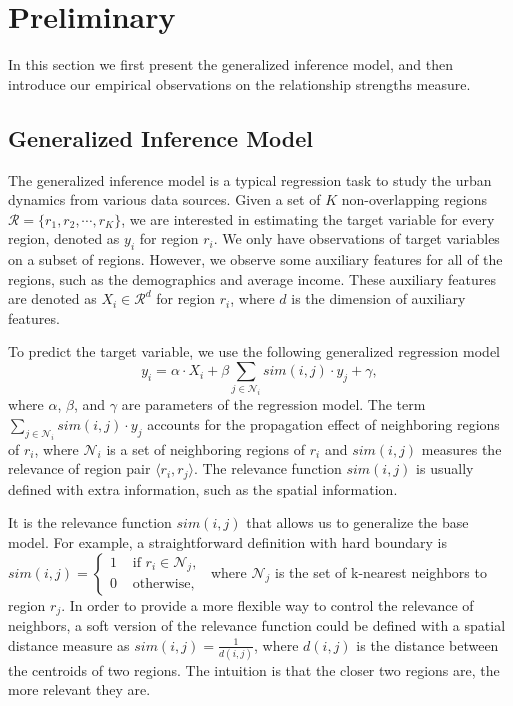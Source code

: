 \section{Preliminary}
\label{ch3-sec:prel}


In this section we first present the generalized inference model, and then introduce our empirical observations on the relationship strengths measure.


\subsection{Generalized Inference Model}

The generalized inference model is a typical regression task to study the urban dynamics from various data sources. Given a set of $K$ non-overlapping regions $\mathcal{R} = \{ r_1, r_2, \cdots, r_K \}$, we are interested in estimating the target variable for every region, denoted as $y_i$ for region $r_i$. We only have observations of target variables on a subset of regions. However, we observe some auxiliary features for all of the regions, such as the demographics and average income. These auxiliary features are denoted as $X_i \in \mathcal{R}^d$ for region $r_i$, where $d$ is the dimension of auxiliary features.


To predict the target variable, we use the following generalized regression model
\begin{equation}
\label{eq:basemodel}
y_i = \alpha \cdot X_i + \beta \sum_{j \in \mathcal{N}_i} sim(i,j) \cdot y_j + \gamma,
\end{equation}
where $\alpha$, $\beta$, and $\gamma$ are parameters of the regression model. The term $\sum_{j \in \mathcal{N}_i} sim(i,j) \cdot y_j$ accounts for the propagation effect of neighboring regions of $r_i$, where $\mathcal{N}_i$ is a set of neighboring regions of $r_i$ and $sim(i,j)$ measures the relevance of region pair $\langle r_i, r_j \rangle$. The relevance function $sim(i,j)$ is usually defined with extra information, such as the spatial information.


It is the relevance function $sim(i,j)$ that allows us to generalize the base model. For example, a straightforward definition with hard boundary is
$sim(i,j) = \left\{ \begin{array}{cc}
1 & \text{ if $r_i \in \mathcal{N}_j$, } \\
0 & \text{ otherwise,}
\end{array}\right.$
where $\mathcal{N}_j$ is the set of k-nearest neighbors to region $r_j$. In order to provide a more flexible way to control the relevance of neighbors, a soft version of the relevance function could be defined with a spatial distance measure as $sim(i,j) = \frac{1}{d(i,j)}$,
where $d(i,j)$ is the distance between the centroids of two regions. The intuition is that the closer two regions are, the more relevant they are.


